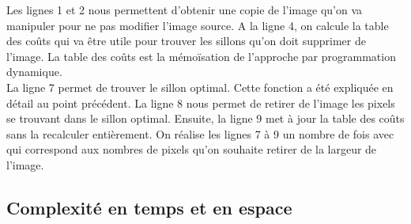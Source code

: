 \documentclass[a4paper, 11pt, oneside]{article}
\begin{document}
Les lignes 1 et 2 nous permettent d'obtenir une copie de l'image qu'on va manipuler pour ne pas modifier l'image source.
A la ligne 4, on calcule la table des coûts qui va être utile pour trouver les sillons qu'on doit supprimer de l'image. La table des coûts est la mémoïsation de l'approche par programmation dynamique.\\
La ligne 7 permet de trouver le sillon optimal. Cette fonction a été expliquée en détail au point précédent. La ligne 8 nous permet de retirer de l'image les pixels se trouvant dans le sillon optimal. Ensuite, la ligne 9 met à jour la table des coûts sans la recalculer entièrement. On réalise les lignes 7 à 9 un nombre  de fois avec  qui correspond aux nombres de pixels qu'on souhaite retirer de la largeur de l'image.

\subsection{Complexité en temps et en espace}
\end{document}
